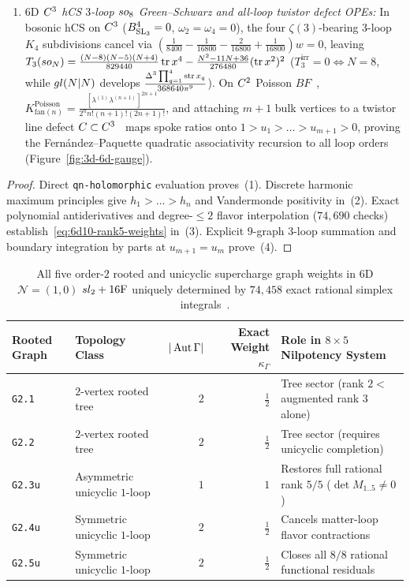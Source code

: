 \begin{theorem}
\begin{enumerate}[label=(\arabic*),leftmargin=*]
  \item \emph{$6\mathrm{D}$ $C^3$ hCS $3$-loop $so_8$ Green--Schwarz and all-loop twistor defect OPEs:} In bosonic hCS on $C^3$ ($B^4_{\operatorname{SL}_3} = 0$, $\omega_2 = \omega_4 = 0$), the four $\zeta(3)$-bearing $3$-loop $K_4$ subdivisions cancel via $(\frac{1}{8400} - \frac{1}{16800} - \frac{2}{16800} + \frac{1}{16800})w = 0$, leaving $T_3(so_N) = \frac{(N-8)(N-5)(N+4)}{829440}\operatorname{tr} x^4 - \frac{N^2-11N+36}{276480}(\operatorname{tr} x^2)^2$ ($T_3^{\mathrm{irr}} = 0 \Longleftrightarrow N = 8$, while $gl(N|N)$ develops $\frac{\Delta^3\prod_{q=1}^4\operatorname{str} x_q}{368640\pi^9}$). On $C^2$ Poisson $BF$~\cite{BW23}, $K^{\mathrm{Poisson}}_{\mathrm{fan}(n)} = \frac{[\lambda^{(1)}\lambda^{(n+1)}]^{2n+1}}{2^n n!(n+1)!(2n+1)!}$, and attaching $m+1$ bulk vertices to a twistor line defect $C \subset C^3$~\cite{BSS22,FP24} maps spoke ratios onto $1 > u_1 > \dots > u_{m+1} > 0$, proving the Fern\'andez--Paquette quadratic associativity recursion to all loop orders (Figure~\ref{fig:3d-6d-gauge}).
\end{enumerate}
\end{theorem}

\begin{proof}
Direct \texttt{qn-holomorphic} evaluation proves~(1). Discrete harmonic maximum principles give $h_1 > \dots > h_n$ and Vandermonde positivity in~(2). Exact polynomial antiderivatives and degree-$\le 2$ flavor interpolation ($74{,}690$ checks) establish~\eqref{eq:6d10-rank5-weights} in~(3). Explicit $9$-graph $3$-loop summation and boundary integration by parts at $u_{m+1} = u_m$ prove~(4).
\end{proof}

\begin{table}[H]
\centering
\scriptsize
\setlength{\tabcolsep}{6pt}
\renewcommand{\arraystretch}{1.15}
\begin{tabular}{@{}llrrl@{}}
\toprule
\textbf{Rooted Graph} & \textbf{Topology Class} & \textbf{$|\operatorname{Aut}\Gamma|$} & \textbf{Exact Weight $\kappa_\Gamma$} & \textbf{Role in $8\times 5$ Nilpotency System} \\
\midrule
\texttt{G2.1} & $2$-vertex rooted tree & $2$ & $\frac{1}{2}$ & Tree sector (rank $2 <$ augmented rank $3$ alone) \\
\texttt{G2.2} & $2$-vertex rooted tree & $2$ & $\frac{1}{2}$ & Tree sector (requires unicyclic completion) \\
\texttt{G2.3u} & Asymmetric unicyclic $1$-loop & $1$ & $1$ & Restores full rational rank $5/5$ ($\det M_{1..5}\neq 0$) \\
\texttt{G2.4u} & Symmetric unicyclic $1$-loop & $2$ & $\frac{1}{2}$ & Cancels matter-loop flavor contractions \\
\texttt{G2.5u} & Symmetric unicyclic $1$-loop & $2$ & $\frac{1}{2}$ & Closes all $8/8$ rational functional residuals \\
\bottomrule
\end{tabular}
\caption{All five order-$2$ rooted and unicyclic supercharge graph weights in $6\mathrm{D}$ $\mathcal{N}=(1,0)$ $sl_2 + 16\mathrm{F}$ uniquely determined by $74{,}458$ exact rational simplex integrals~\cite{Repo9e833c8}.}
\label{tab:6d10-weights}
\end{table}

